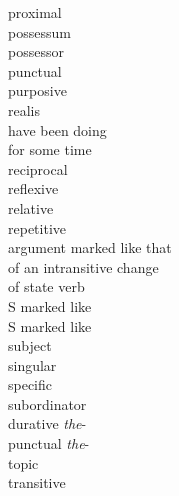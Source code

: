\begin{multicols}{2}
\begin{tabbing}
     \> proximal\\ 
      \> possessum\\ 
      \> possessor\\ 
      \> punctual\\ 
     \> purposive\\ 
     \> realis\\ 
 \> have been doing\\
			  \> for some time\\ 
     \> reciprocal\\ 
     \> reflexive\\ 
      \> relative\\ 
      \> repetitive\\ 
 						 \> argument marked like that\\ 
							 \> of an intransitive change \\
							 \> of state verb\\ 
      \> S marked like \\ 
      \> S marked like \\ 
                     \> subject\\ 
                      \> singular\\ 
                    \> specific\\ 
                    \> subordinator\\ 
  \> durative \textit{the}-\\ 
 \> punctual \textit{the}-\\ 
                     \> topic\\ 
                      \> transitive
\end{tabbing}
\end{multicols}

